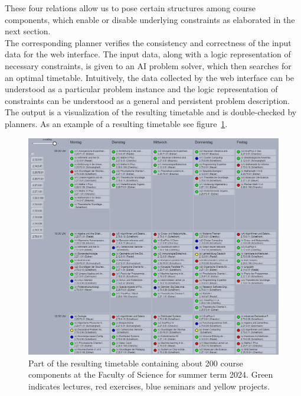 \documentclass{easychair}
\begin{document}
  These four relations allow us to pose certain structures among course components, which enable or disable underlying constraints as elaborated in the next section. \\ 
  The corresponding planner verifies the consistency and correctness of the input data for the web interface. 
  The input data, along with a logic representation of necessary constraints, is given to an AI problem solver, which then searches for an optimal timetable. 
  Intuitively, the data collected by the web interface can be understood as a particular problem instance and the logic representation of constraints can be understood as a general and persistent problem description. 
  The output is a visualization of the resulting timetable and is double-checked by planners. 
  As an example of a resulting timetable see figure~\ref{fig:timetable}. 
  \begin{figure}
    \includegraphics[width=\linewidth]{timetable}
    \caption{Part of the resulting timetable containing about 200 course components at the Faculty of Science for summer term 2024. Green indicates lectures, red exercises, blue seminars and yellow projects.}
    \label{fig:timetable}
  \end{figure} \\
\end{document}
